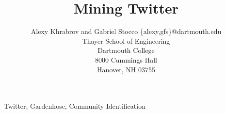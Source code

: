 \documentclass[]{spie}
\begin{document}
\title{Mining Twitter}
	
\author{Alexy Khrabrov and Gabriel Stocco
\skiplinehalf
{\{alexy,gfs\}}@dartmouth.edu\\
Thayer School of Engineering\\
Dartmouth College\\
8000 Cummings Hall\\
Hanover, NH 03755}

\maketitle 

\begin{keywords}
	Twitter, Gardenhose, Community Identification
\end{keywords}




\end{document}
